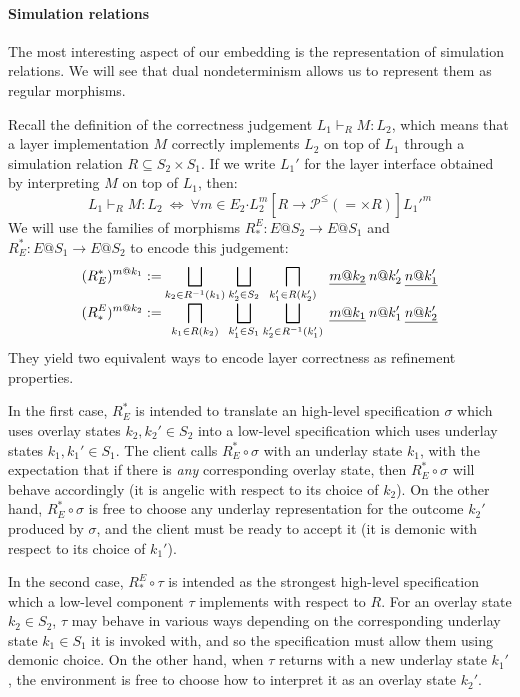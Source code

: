 \documentclass[sigplan,screen]{acmart}
\newcommand{\bdot}{\boldsymbol{\cdot}}
\begin{document}
\paragraph{Simulation relations}

The most interesting aspect of our embedding
is the representation of simulation relations.
We will see that dual nondeterminism
allows us to represent them as regular morphisms.

Recall the definition of
the correctness judgement $L_1 \vdash_R M : L_2$,
which means that a layer implementation $M$
correctly implements $L_2$ on top of $L_1$
through a simulation relation $R \subseteq S_2 \times S_1$.
If we write $L_1'$ for the layer interface obtained
by interpreting $M$ on top of $L_1$,
then:
\[
  L_1 \vdash_R M : L_2 \:\Leftrightarrow\:
  \forall m \in E_2 \bdot
    L_2^m
    \mathrel{[R \rightarrow \mathcal{P}^\le({=} \times R)]}
    {L_1'}^m
\]
We will use the families of morphisms
$R_*^E : E@S_2 \rightarrow E@S_1$ and
$R^*_E : E@S_1 \rightarrow E@S_2$
to encode this judgement:
\[
  {\everymath={\displaystyle}
  \begin{array}{r@{\:}c@{\:}c@{\:}c@{\:}l}
  (R^*_E)^{m@k_1} := &
    \bigsqcup_{k_2 \in R^{-1}(k_1)} &
    \bigsqcup_{k_2' \in S_2} &
    \bigsqcap_{k_1' \in R(k_2')} &
    \: \underline{m@k_2} \: n@k_2' \: \underline{n@k_1'} \\
  (R_*^E)^{m@k_2} := &
    \bigsqcap_{k_1 \in R(k_2)} &
    \bigsqcup_{k_1' \in S_1} &
    \bigsqcup_{k_2' \in R^{-1}(k_1')} &
    \: \underline{m@k_1} \: n@k_1' \: \underline{n@k_2'}
  \end{array}}
\]
They yield two equivalent ways to encode
layer correctness as refinement properties.

In the first case,
$R^*_E$ is intended to translate
an high-level specification $\sigma$
which uses overlay states $k_2, k_2' \in S_2$
into a low-level specification which uses underlay states
$k_1, k_1' \in S_1$.
The client calls $R^*_E \circ \sigma$
with an underlay state $k_1$,
with the expectation that if there is \emph{any}
corresponding overlay state,
then $R^*_E \circ \sigma$ will behave accordingly
(it is angelic with respect to its choice of $k_2$).
On the other hand,
$R^*_E \circ \sigma$ is free to choose any underlay representation
for the outcome $k_2'$ produced by $\sigma$,
and the client must be ready to accept it
(it is demonic with respect to its choice of $k_1'$).

In the second case,
$R_*^E \circ \tau$ is intended as
the strongest high-level specification
which a low-level component $\tau$ implements
with respect to $R$.
For an overlay state $k_2 \in S_2$,
$\tau$ may behave in various ways
depending on the corresponding underlay state $k_1 \in S_1$
it is invoked with,
and so the specification must allow them using demonic choice.
On the other hand,
when $\tau$ returns with a new underlay state $k_1'$,
the environment is free to choose
how to interpret it as an overlay state $k_2'$.
\end{document}
